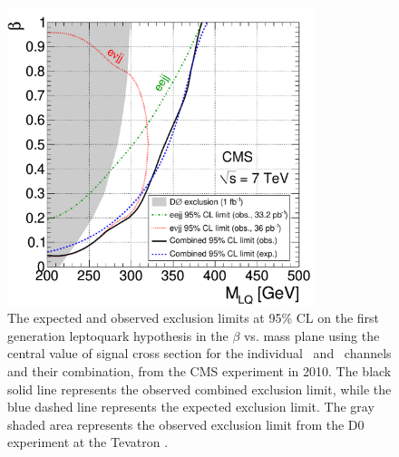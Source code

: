 \begin{figure}
  \centering
  \includegraphics[width=0.80\textwidth]{tex/theory/fig/limits/CMS-2010.pdf}
  \caption{
    The expected and observed exclusion limits at 95\% CL on the first generation leptoquark
    hypothesis in the $\beta$ vs. mass plane using the central value of signal cross section for the
    individual \eejj~and \enujj~channels and their combination, from the CMS experiment in 2010.  
    The black solid line represents the observed combined exclusion limit, while the blue dashed line represents
    the expected exclusion limit.    
    The gray shaded area represents the observed exclusion limit from the D0 experiment at the Tevatron \cite{lq1-paolo,lq1-dinko}.
  }
  \label{fig:cms-limit}
\end{figure}
